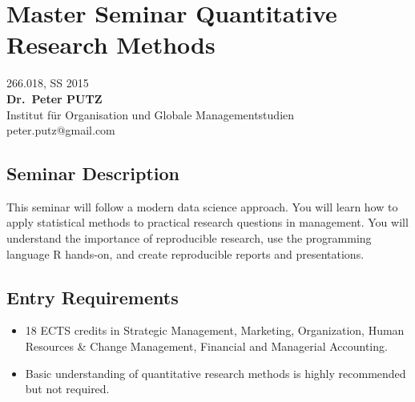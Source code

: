 \documentclass[]{article}
\author{}
\date{}
\begin{document}

\centering

\section{Master Seminar Quantitative Research
Methods}\label{master-seminar-quantitative-research-methods}

266.018, SS 2015\\\textbf{Dr.~Peter PUTZ}\\Institut für Organisation und
Globale Managementstudien\\peter.putz@gmail.com

\raggedright

\subsection{Seminar Description}\label{seminar-description}

This seminar will follow a modern data science approach. You will learn
how to apply statistical methods to practical research questions in
management. You will understand the importance of reproducible research,
use the programming language R hands-on, and create reproducible reports
and presentations.

\subsection{Entry Requirements}\label{entry-requirements}

\begin{itemize}
\itemsep1pt\parskip0pt
\item
  18 ECTS credits in Strategic Management, Marketing, Organization,
  Human Resources \& Change Management, Financial and Managerial
  Accounting.
\item
  Basic understanding of quantitative research methods is highly
  recommended but not required.
\end{itemize}
\end{document}

